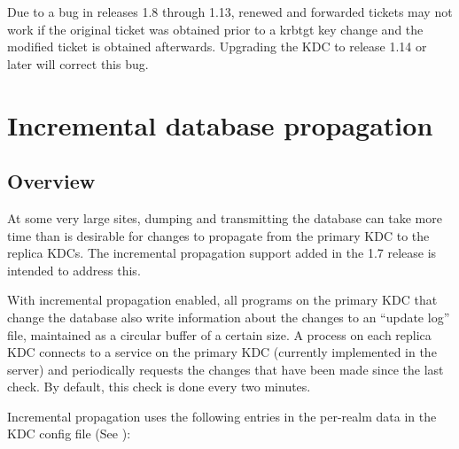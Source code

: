 \documentclass[letterpaper,10pt,english]{sphinxmanual}
\begin{document}
Due to a bug in releases 1.8 through 1.13, renewed and forwarded
tickets may not work if the original ticket was obtained prior to a
krbtgt key change and the modified ticket is obtained afterwards.
Upgrading the KDC to release 1.14 or later will correct this bug.


\section{Incremental database propagation}
\label{\detokenize{admin/database:incremental-database-propagation}}\label{\detokenize{admin/database:incr-db-prop}}

\subsection{Overview}
\label{\detokenize{admin/database:overview}}
At some very large sites, dumping and transmitting the database can
take more time than is desirable for changes to propagate from the
primary KDC to the replica KDCs.  The incremental propagation support
added in the 1.7 release is intended to address this.

With incremental propagation enabled, all programs on the primary KDC
that change the database also write information about the changes to
an “update log” file, maintained as a circular buffer of a certain
size.  A process on each replica KDC connects to a service on the
primary KDC (currently implemented in the {\hyperref[\detokenize{admin/admin_commands/kadmind:kadmind-8}]{}} server) and
periodically requests the changes that have been made since the last
check.  By default, this check is done every two minutes.

Incremental propagation uses the following entries in the per-realm
data in the KDC config file (See {\hyperref[\detokenize{admin/conf_files/kdc_conf:kdc-conf-5}]{}}):
\end{document}
